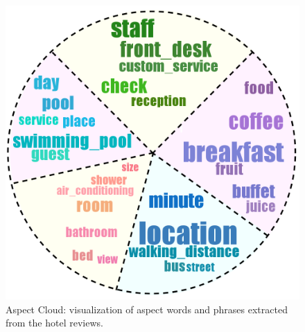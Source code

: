 \begin{figure}[t]
	\centering
	\includegraphics[width=0.8\columnwidth]{figures/topics_hotel}
	\caption{Aspect Cloud: visualization of aspect words and phrases extracted from the hotel reviews.}
	\label{fig:topiccloud}
\end{figure}

